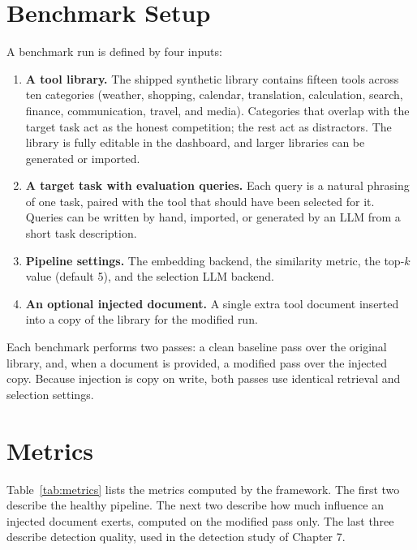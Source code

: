 \documentclass[11pt,a4paper]{report}
\begin{document}
\section{Benchmark Setup}

A benchmark run is defined by four inputs:

\begin{enumerate}
  \item \textbf{A tool library.} The shipped synthetic library contains
  fifteen tools across ten categories (weather, shopping, calendar,
  translation, calculation, search, finance, communication, travel, and
  media). Categories that overlap with the target task act as the honest
  competition; the rest act as distractors. The library is fully
  editable in the dashboard, and larger libraries can be generated or
  imported.
  \item \textbf{A target task with evaluation queries.} Each query is a
  natural phrasing of one task, paired with the tool that should have
  been selected for it. Queries can be written by hand, imported, or
  generated by an LLM from a short task description.
  \item \textbf{Pipeline settings.} The embedding backend, the similarity
  metric, the top-$k$ value (default 5), and the selection LLM backend.
  \item \textbf{An optional injected document.} A single extra tool
  document inserted into a copy of the library for the modified run.
\end{enumerate}

Each benchmark performs two passes: a clean baseline pass over the
original library, and, when a document is provided, a modified pass over
the injected copy. Because injection is copy on write, both passes use
identical retrieval and selection settings.

\section{Metrics}

Table~\ref{tab:metrics} lists the metrics computed by the framework. The
first two describe the healthy pipeline. The next two describe how much
influence an injected document exerts, computed on the modified pass
only. The last three describe detection quality, used in the detection
study of Chapter 7.
\end{document}
